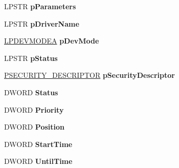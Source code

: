 \begin{DoxyCompactItemize}
\mbox{\label{struct___j_o_b___i_n_f_o__2_a_a80103ab2fba1f14e4d430d3ccff435bf}} 
L\+P\+S\+TR {\bfseries p\+Parameters}
\item 
\mbox{\label{struct___j_o_b___i_n_f_o__2_a_a6a671917d60d02ea7939624d5f75ac51}} 
L\+P\+S\+TR {\bfseries p\+Driver\+Name}
\item 
\mbox{\label{struct___j_o_b___i_n_f_o__2_a_ad071bba414beed8a451c250771165451}} 
\hyperlink{struct__devicemode_a}{L\+P\+D\+E\+V\+M\+O\+D\+EA} {\bfseries p\+Dev\+Mode}
\item 
\mbox{\label{struct___j_o_b___i_n_f_o__2_a_ae2d89957175efaecfc35e18cdd0aaab4}} 
L\+P\+S\+TR {\bfseries p\+Status}
\item 
\mbox{\label{struct___j_o_b___i_n_f_o__2_a_ace5d27d6a225e6277a99bec2e08b7be2}} 
\hyperlink{struct___s_e_c_u_r_i_t_y___d_e_s_c_r_i_p_t_o_r}{P\+S\+E\+C\+U\+R\+I\+T\+Y\+\_\+\+D\+E\+S\+C\+R\+I\+P\+T\+OR} {\bfseries p\+Security\+Descriptor}
\item 
\mbox{\label{struct___j_o_b___i_n_f_o__2_a_a6b578ce6e7ef0f40e05a2cf6611edb63}} 
D\+W\+O\+RD {\bfseries Status}
\item 
\mbox{\label{struct___j_o_b___i_n_f_o__2_a_a42c8e3426116baad1487b20f4f7f6f1c}} 
D\+W\+O\+RD {\bfseries Priority}
\item 
\mbox{\label{struct___j_o_b___i_n_f_o__2_a_a5fab38b5d264ac00e2bc858193df8945}} 
D\+W\+O\+RD {\bfseries Position}
\item 
\mbox{\label{struct___j_o_b___i_n_f_o__2_a_a44d574d2d5348a86e45ddd45bce3931f}} 
D\+W\+O\+RD {\bfseries Start\+Time}
\item 
\mbox{\label{struct___j_o_b___i_n_f_o__2_a_a752d8d1778b94d4968d544b9423b1cf6}} 
D\+W\+O\+RD {\bfseries Until\+Time}
\item 
\mbox{\label{struct___j_o_b___i_n_f_o__2_a_a9edfca69211af5a2080633979a9b4054}} 

\end{DoxyCompactItemize}
